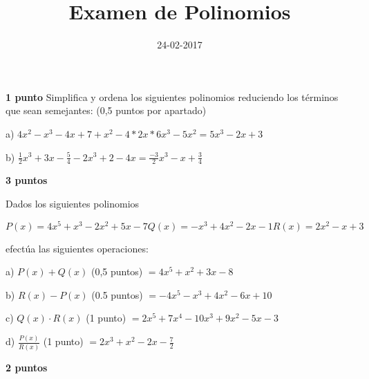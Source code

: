 \documentclass[palatino,noprobframes]{CuartillaSafa}
\title{Examen de Polinomios}
\date{24-02-2017}
\begin{document}
\cabecera
\pagestyle{fancy}

\begin{problem}\textbf{1 punto}
Simplifica y ordena los siguientes polinomios reduciendo los términos que sean semejantes: (0,5 puntos por apartado)

a) $4x^2-x^3-4x+7+x^2-4*2x*6x^3-5x^2 = 5x^3-2x+3$

b) $\frac{1}{2}x^3+3x-\frac{5}{4}-2x^3+2-4x = \frac{-3}{2}x^3-x+\frac{3}{4}$

\end{problem}

\begin{problem}\textbf{3 puntos}

Dados los siguientes polinomios

\[
P(x) = 4x^5+x^3-2x^2+5x - 7 
Q(x) = -x^3+4x^2-2x-1 
R(x) = 2x^2-x+3
\]

efectúa las siguientes operaciones:

a) $P(x) +Q(x)$ (0,5 puntos) $= 4x^5+x^2+3x-8$

b) $R(x) - P(x)$ (0.5 puntos) $=-4x^5-x^3+4x^2-6x+10$

c) $Q(x)\cdot R(x)$ (1 punto) $=2x^5+7x^4-10x^3+9x^2-5x-3$

d) $\frac{P(x)}{R(x)}$ (1 punto) $= 2x^3+x^2-2x-\frac{7}{2}$

\end{problem}

\begin{problem}\textbf{2 puntos}

\end{problem}

\end{document}
